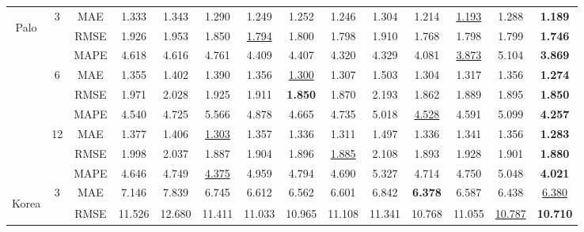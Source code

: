 \documentclass[lettersize,journal]{IEEEtran}
\begin{document}
\begin{table*}[htbp]
{\begin{tabular}{cccccccccccccc}
			\midrule
			\multirow{9}[6]{*}{\begin{sideways}Palo\end{sideways}} & \multirow{3}[2]{*}{3} & MAE   & 1.333  & 1.343  & 1.290  & 1.249  & 1.252  & 1.246  & 1.304  & 1.214  & \underline{1.193 } & 1.288  & \cellcolor{tablegray}\textbf{1.189 } \\
			&       & RMSE  & 1.926  & 1.953  & 1.850  & \underline{1.794 } & 1.800  & 1.798  & 1.910  & 1.768  & 1.798  & 1.799  & \cellcolor{tablegray}\textbf{1.746 } \\
			&       & MAPE & 4.618  & 4.616  & 4.761  & 4.409  & 4.407  & 4.320  & 4.329  & 4.081  & \underline{3.873 } & 5.104  & \cellcolor{tablegray}\textbf{3.869 } \\
			\cmidrule{2-14}          & \multirow{3}[2]{*}{6} & MAE   & 1.355  & 1.402  & 1.390  & 1.356  & \underline{1.300 } & 1.307  & 1.503  & 1.304  & 1.317  & 1.356  & \cellcolor{tablegray}\textbf{1.274 } \\
			&       & RMSE  & 1.971  & 2.028  & 1.925  & 1.911  & \textbf{1.850 } & 1.870  & 2.193  & 1.862  & 1.889  & 1.895  & \cellcolor{tablegray}\textbf{1.850 } \\
			&       & MAPE & 4.540  & 4.725  & 5.566  & 4.878  & 4.665  & 4.735  & 5.018  & \underline{4.528 } & 4.591  & 5.099  & \cellcolor{tablegray}\textbf{4.257 } \\
			\cmidrule{2-14}          & \multirow{3}[2]{*}{12} & MAE   & 1.377  & 1.406  & \underline{1.303 } & 1.357  & 1.336  & 1.311  & 1.497  & 1.336  & 1.341  & 1.356  & \cellcolor{tablegray}\textbf{1.283 } \\
			&       & RMSE  & 1.998  & 2.037  & 1.887  & 1.904  & 1.896  & \underline{1.885 } & 2.108  & 1.893  & 1.928  & 1.901  & \cellcolor{tablegray}\textbf{1.880 } \\
			&       & MAPE & 4.646  & 4.749  & \underline{4.375 } & 4.959  & 4.794  & 4.690  & 5.327  & 4.714  & 4.750  & 5.048  & \cellcolor{tablegray}\textbf{4.021 } \\
			\midrule
			\multirow{9}[6]{*}{\begin{sideways}Korea\end{sideways}} & \multirow{3}[2]{*}{3} & MAE   & 7.146  & 7.839  & 6.745  & 6.612  & 6.562  & 6.601  & 6.842  & \textbf{6.378 } & 6.587  & 6.438  & \cellcolor{tablegray}\underline{6.380 } \\
			&       & RMSE  & 11.526  & 12.680  & 11.411  & 11.033  & 10.965  & 11.108  & 11.341  & 10.768  & 11.055  & \underline{10.787 } & \cellcolor{tablegray}\textbf{10.710 } \\

\end{tabular}}
\end{table*}
\end{document}
